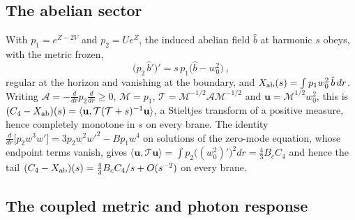 \subsection{The abelian sector}
\label{app:response-abelian}

With $p_1 = e^{Z-2V}$ and $p_2 = Ue^Z$, the
induced abelian field $\hat b$ at harmonic $s$ obeys, with the metric frozen,
\begin{equation}
\big(p_2\,\hat b'\big)' = s\,p_1\big(\hat b - w_0^2\big)~,
\end{equation}
regular at the horizon and vanishing at the boundary, and
$X_{\rm ab}(s) = \int p_1 w_0^2\,\hat b\,dr$. Writing $\mathcal{A} = -\tfrac{d}{dr}p_2\tfrac{d}{dr}
\ge 0$, $\mathcal{M} = p_1$, $\mathcal{T} = \mathcal{M}^{-1/2}\mathcal{A}\mathcal{M}^{-1/2}$ and $\mathbf{u} = \mathcal{M}^{1/2}w_0^2$, this is
$(C_4 - X_{\rm ab})(s) = \langle \mathbf{u}, \mathcal{T}(\mathcal{T}+s)^{-1}\mathbf{u}\rangle$, a Stieltjes transform of a
positive measure, hence completely monotone in $s$ on every brane. The
identity $\tfrac{d}{dr}\big[p_2 w^3 w'\big] = 3p_2 w^2 w'^2 - Bp_1 w^4$ on
solutions of the zero-mode equation, whose endpoint terms vanish, gives
$\langle \mathbf{u}, \mathcal{T}\mathbf{u}\rangle = \int p_2\big((w_0^2)'\big)^2 dr = \tfrac43 B_c C_4$
and hence the tail $(C_4 - X_{\rm ab})(s) = \tfrac43 B_c C_4/s + O(s^{-2})$
on every brane.

\subsection{The coupled metric and photon response}
\label{app:response-metric}

